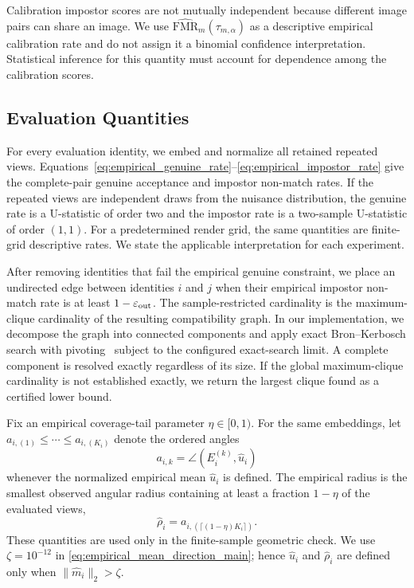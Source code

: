 \documentclass[journal]{IEEEtran}
\begin{document}
\begin{bibunit}
Calibration impostor scores are not mutually independent because different image pairs can share an image. We use $\widehat{\mathrm{FMR}}_m(\tau_{m,\alpha})$ as a descriptive empirical calibration rate and do not assign it a binomial confidence interpretation. Statistical inference for this quantity must account for dependence among the calibration scores.



\subsection{Evaluation Quantities}

For every evaluation identity, we embed and normalize all retained repeated views. Equations~\eqref{eq:empirical_genuine_rate}--\eqref{eq:empirical_impostor_rate} give the complete-pair genuine acceptance and impostor non-match rates. If the repeated views are independent draws from the nuisance distribution, the genuine rate is a U-statistic of order two and the impostor rate is a two-sample U-statistic of order $(1,1)$. For a predetermined render grid, the same quantities are finite-grid descriptive rates. We state the applicable interpretation for each experiment.

After removing identities that fail the empirical genuine constraint, we place an undirected edge between identities $i$ and $j$ when their empirical impostor non-match rate is at least $1-\varepsilon_{\rm out}$. The sample-restricted cardinality is the maximum-clique cardinality of the resulting compatibility graph.  In our implementation, we decompose the graph into connected components and apply exact Bron--Kerbosch search with pivoting~\cite{bron1973algorithm} subject to the configured exact-search limit. A complete component is resolved exactly regardless of its size. If the global maximum-clique cardinality is not established exactly, we return the largest clique found as a certified lower bound.

Fix an empirical coverage-tail parameter $\eta\in[0,1)$. For the same embeddings, let $a_{i,(1)}\le\cdots\le a_{i,(K_i)}$ denote the ordered angles
\[
a_{i,k}=\angle(E_i^{(k)},\widehat u_i)
\]
whenever the normalized empirical mean $\widehat u_i$ is defined. The empirical radius is the smallest observed angular radius containing at least a fraction $1-\eta$ of the evaluated views,
%
\begin{equation}
\widehat\rho_i = a_{i,(\lceil(1-\eta)K_i\rceil)}.
\label{eq:supp_empirical_radius_order_stat}
\end{equation}
%
These quantities are used only in the finite-sample geometric check. We use $\zeta=10^{-12}$ in \eqref{eq:empirical_mean_direction_main}; hence $\widehat u_i$ and $\widehat\rho_i$ are defined only when $\|\widehat m_i\|_2>\zeta$.


\end{bibunit}
\end{document}
